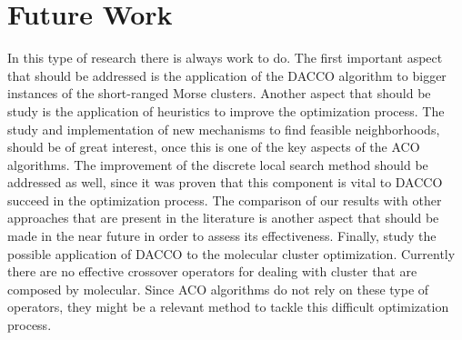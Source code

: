\section{Future Work}

In this type of research there is always work to do. The first important aspect that should be addressed is the application of the DACCO algorithm to bigger instances of the short-ranged Morse clusters. Another aspect that should be study is the application of heuristics to improve the optimization process. The study and implementation of new mechanisms to find feasible neighborhoods, should be of great interest, once this is one of the key aspects of the ACO algorithms. The improvement of the discrete local search method should be addressed as well, since it was proven that this component is vital to DACCO succeed in the optimization process. The comparison of our results with other approaches that are present in the literature is another aspect that should be made in the near future in order to assess its effectiveness. Finally, study the possible application of DACCO to the molecular cluster optimization. Currently there are no effective crossover operators for dealing with cluster that are composed by molecular. Since ACO algorithms do not rely on these type of operators, they might be a relevant method to tackle this difficult optimization process.








